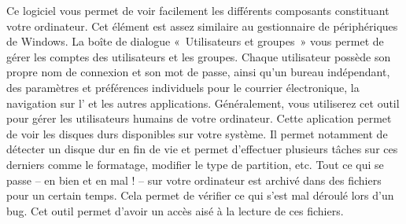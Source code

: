 Ce logiciel vous permet de voir facilement les différents composants constituant votre ordinateur. Cet élément est assez similaire au gestionnaire de périphériques de Windows.
La boîte de dialogue «~Utilisateurs et groupes~» vous permet de gérer les comptes des utilisateurs et les groupes. Chaque utilisateur possède son propre nom de connexion et son mot de passe, ainsi qu'un bureau indépendant, des paramètres et préférences individuels pour le courrier électronique, la navigation sur l' et les autres applications. Généralement, vous utiliserez cet outil pour gérer les utilisateurs humains de votre ordinateur.
Cette aplication permet de voir les disques durs disponibles sur votre système. Il permet notamment de détecter un disque dur en fin de vie et permet d'effectuer plusieurs tâches sur ces derniers comme le formatage, modifier le type de partition, etc.
Tout ce qui se passe -- en bien et en mal ! -- sur votre ordinateur est archivé dans des fichiers  pour un certain temps. Cela permet de vérifier ce qui s'est mal déroulé lors d'un bug. Cet outil permet d'avoir un accès aisé à la lecture de ces fichiers.

